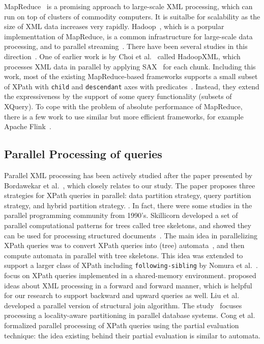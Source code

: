 MapReduce~\cite{DeGh04} is a promising approach to large-scale XML processing,
which can run on top of clusters of commodity computers. It is suitalbe for
scalability as the size of XML data increases very rapidly.
Hadoop~\cite{HadoopWhit12}, which is a porpular implementtation of MapReduce, is
a common infrastructure for large-scale data processing, and to parallel
streaming~\cite{OgTP13,LiZZ17}. There have been several studies in this
direction~\cite{BCMU13,CFKL12,DaGP14,EmIm12,DaGP14,MaMi16}. One of earlier work
is by Choi et al.~\cite{CLKL12} called HadoopXML, which processes XML data in
parallel by applying SAX~\cite{sax} for each chunk. Including this work, most of
the existing MapReduce-based frameworks supports a small subset of XPath with
\texttt{child} and \texttt{descendant} axes with
predicates~\cite{CCMN15,AfDG15,DaGP14,DaGK14}. Instead, they extend the
expressiveness by the support of some query functionality (subsets of XQuery).
To cope with the problem of absolute performance of MapReduce, there is a few
work to use similar but more efficient frameworks, for example Apache
Flink~\cite{CCMN15}.

\subsection{Parallel Processing of queries}

Parallel XML processing has been actively studied after the paper presented by
Bordawekar et al.~\cite{BoLS09}, which closely relates to our study. The paper
proposes three strategies for XPath queries in parallel: data partition
strategy, query partition strategy, and hybrid partition strategy. . In fact,
there were some studies in the parallel programming community from 1990's.
Skillicorn developed a set of parallel computational patterns for trees called
tree skeletons, and showed they can be used for processing structured
documents~\cite{Skil97}. The main idea in parallelizing XPath queries was to
convert XPath queries into (tree) automata~\cite{comon2007tree}, and then
compute automata in parallel with tree skeletons. This idea was extended to
support a larger class of XPath including \texttt{following-sibling} by Nomura
et al.~\cite{NEMH07}. \cite{KrYa10,PLZC07,ZhPC10} focus on XPath queries
implemented in a shared-memory environment. \cite{AAHa11} proposed ideas about
XML processing in a forward and forward manner, which is helpful for our
research to support backward and upward queries as well. Liu et
al.~\cite{LFLQ08} developed a parallel version of structural join algorithm. The
study~\cite{ZaBS15} focuses processing a locality-aware partitioning in parallel
database systems. Cong et al.~\cite{CFKL12} formalized parallel processing of
XPath queries using the partial evaluation technique: the idea existing behind
their partial evaluation is similar to automata.

